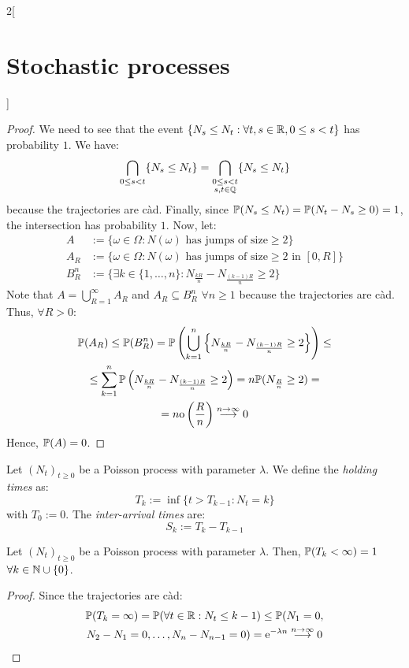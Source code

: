 \documentclass[../../../main_math.tex]{subfiles}
\begin{document}
\begin{multicols}{2}[\section{Stochastic processes}]
\begin{proposition}
  \end{proposition}
  \begin{proof}
    We need to see that the event $\{N_s\leq N_t: \forall t,s\in\mathbb{R}, 0\leq s < t\}$ has probability $1$. We have:
    $$
      \bigcap_{0\leq s < t}\{N_s\leq N_t\}= \bigcap_{\substack{0\leq s < t\\s,t\in\mathbb{Q}}}\{N_s\leq N_t\}
    $$
    because the trajectories are càd. Finally, since $\mathbb{P}(N_s\leq N_t)=\mathbb{P}(N_t-N_s\geq 0)=1$, the intersection has probability $1$. Now, let:
    \begin{align*}
      A     & :=\{\omega\in\Omega:N(\omega)\text{ has jumps of size}\geq 2\}                   \\
      A_R   & :=\{\omega\in\Omega:N(\omega)\text{ has jumps of size}\geq 2\text{ in $[0,R]$}\} \\
      B_R^n & :=\{\exists k\in\{1,\ldots,n\}: N_{\frac{kR}{n}}-N_{\frac{(k-1)R}{n}}\geq 2\}
    \end{align*}
    Note that $A=\bigcup_{R=1}^\infty A_R$ and $A_R\subseteq B_R^n$ $\forall n\geq 1$ because the trajectories are càd. Thus, $\forall R>0$:
    \begin{multline*}
      \mathbb{P}(A_R)\leq \mathbb{P}(B_R^n)=\mathbb{P}\left(\bigcup_{k=1}^n\left\{N_{\frac{kR}{n}}-N_{\frac{(k-1)R}{n}}\geq 2\right\}\right)\leq\\
      \leq\sum_{k=1}^n\mathbb{P}\left(N_{\frac{kR}{n}}-N_{\frac{(k-1)R}{n}}\geq 2\right)=n\mathbb{P}(N_{\frac{R}{n}}\geq 2)=\\=n\mathrm{o}\left(\frac{R}{n}\right)\overset{n\to\infty}{\longrightarrow}0
    \end{multline*}
    Hence, $\mathbb{P}(A)=0$.
  \end{proof}
  \begin{definition}
    Let ${(N_t)}_{t\geq 0}$ be a Poisson process with parameter $\lambda$. We define the \emph{holding times} as:
    $$
      T_k:=\inf\{t> T_{k-1}:N_t=k\}
    $$
    with $T_0:=0$. The \emph{inter-arrival times} are:
    $$
      S_k:=T_k-T_{k-1}
    $$
  \end{definition}
  \begin{lemma}
    Let ${(N_t)}_{t\geq 0}$ be a Poisson process with parameter $\lambda$. Then, $\mathbb{P}(T_k < \infty)=1$ $\forall k\in\mathbb{N}\cup\{0\}$.
  \end{lemma}
  \begin{proof}
    Since the trajectories are càd:
    \begin{multline*}
      \Prob(T_k=\infty)=\Prob(\forall t\in\RR: N_t\leq k-1)\leq \Prob(N_1=0,\\N_2-N_1 =0,\ldots,N_n-N_{n-1}=0)=\exp{-\lambda n} \overset{n\to\infty}{\longrightarrow}0

\end{multline*}
\end{proof}
\end{multicols}
\end{document}

